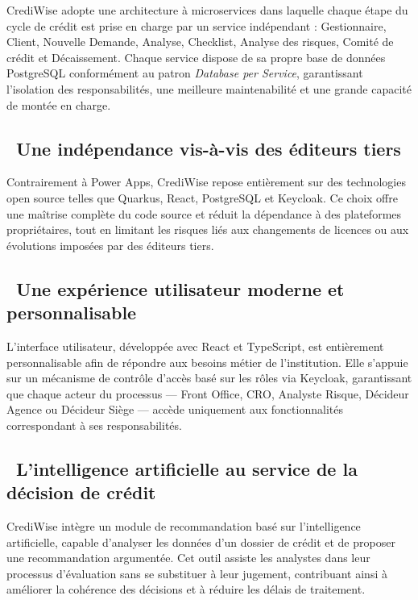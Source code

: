 CrediWise adopte une architecture à microservices dans laquelle chaque étape du cycle de
crédit est prise en charge par un service indépendant : Gestionnaire, Client, Nouvelle
Demande, Analyse, Checklist, Analyse des risques, Comité de crédit et Décaissement. Chaque
service dispose de sa propre base de données PostgreSQL conformément au patron
\textit{Database per Service}, garantissant l'isolation des responsabilités, une meilleure
maintenabilité et une grande capacité de montée en charge.

\subsection*{~Une indépendance vis-à-vis des éditeurs tiers}

Contrairement à Power Apps, CrediWise repose entièrement sur des technologies open source
telles que Quarkus, React, PostgreSQL et Keycloak. Ce choix offre une maîtrise complète du
code source et réduit la dépendance à des plateformes propriétaires, tout en limitant les
risques liés aux changements de licences ou aux évolutions imposées par des éditeurs tiers.

\subsection*{~Une expérience utilisateur moderne et personnalisable}

L'interface utilisateur, développée avec React et TypeScript, est entièrement personnalisable
afin de répondre aux besoins métier de l'institution. Elle s'appuie sur un mécanisme de
contrôle d'accès basé sur les rôles via Keycloak, garantissant que chaque acteur du
processus — Front Office, CRO, Analyste Risque, Décideur Agence ou Décideur Siège — accède
uniquement aux fonctionnalités correspondant à ses responsabilités.

\subsection*{~L'intelligence artificielle au service de la décision de crédit}

CrediWise intègre un module de recommandation basé sur l'intelligence artificielle, capable
d'analyser les données d'un dossier de crédit et de proposer une recommandation argumentée.
Cet outil assiste les analystes dans leur processus d'évaluation sans se substituer à leur
jugement, contribuant ainsi à améliorer la cohérence des décisions et à réduire les délais
de traitement.

